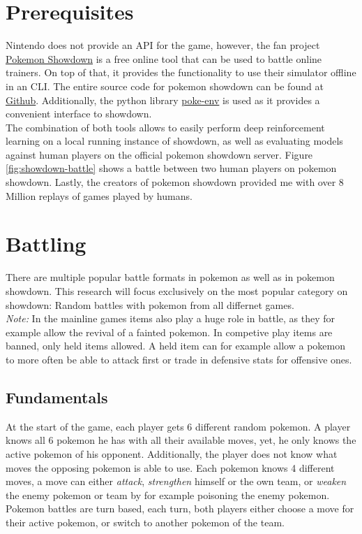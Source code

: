 \documentclass{article}
\begin{document}
\section{Prerequisites}
Nintendo does not provide an API for the game, however, the fan project
\href{https://play.pokemonshowdown.com/}{Pokemon Showdown} is a
free online tool that can be used to battle online trainers. On top of that,
it provides the functionality to use their simulator offline in an CLI. The
entire source code for pokemon showdown can be found at 
\href{https://github.com/smogon/pokemon-showdown}{Github}.
Additionally, the python library \href{https://poke-env.readthedocs.io/en/latest/}{poke-env}
is used as it provides a convenient interface to showdown. \\
The combination of both tools allows to easily perform deep reinforcement learning
on a local running instance of showdown, as well as evaluating models against 
human players on the official pokemon showdown server. Figure \ref{fig:showdown-battle}
shows a battle between two human players on pokemon showdown. Lastly, the creators
of pokemon showdown provided me with over 8 Million replays of games played
by humans.

\section{Battling}
There are multiple popular battle formats in pokemon as well as in pokemon
showdown. This research will focus exclusively on the most popular category
on showdown: Random battles with pokemon from all differnet games. \\
\textit{Note:} In the mainline games items also play a huge role in battle,
as they for example allow the revival of a fainted pokemon. In competive
play items are banned, only held items allowed. A held item can for example
allow a pokemon to more often be able to attack first or trade in defensive
stats for offensive ones.

\subsection{Fundamentals}
At the start of the game, each player gets 6 different random pokemon. A player
knows all 6 pokemon he has with all their available moves, yet, he only knows
the active pokemon of his opponent. Additionally, the player does not know what
moves the opposing pokemon is able to use. Each pokemon knows 4 different moves,
a move can either \textit{attack}, \textit{strengthen} himself or the own team,
or \textit{weaken} the enemy pokemon or team by for example poisoning the enemy
pokemon. \\ 
Pokemon battles are turn based, each turn, both players either choose a move
for their active pokemon, or switch to another pokemon of the team. 
\end{document}
